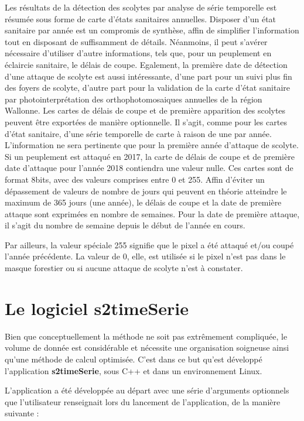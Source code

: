 \documentclass[a4paper, 12pt]{article} %
\begin{document}
Les résultats de la détection des scolytes par analyse de série temporelle est résumée sous forme de carte d'états sanitaires annuelles. Disposer d'un état sanitaire par année est un compromis de synthèse, affin de simplifier l'information tout en disposant de suffisamment de détails. Néanmoins, il peut s'avérer nécessaire d'utiliser d'autre informations, tels que, pour un peuplement en éclaircie sanitaire, le délais de coupe. Egalement, la première date de détection d'une attaque de scolyte est aussi intéressante, d'une part pour un suivi plus fin des foyers de scolyte, d'autre part pour la validation de la carte d'état sanitaire par photointerprétation des orthophotomosaiques annuelles de la région Wallonne.
Les cartes de délais de coupe et de première apparition des scolytes peuvent être exportées de manière optionnelle. Il s'agit, comme pour les cartes d'état sanitaire, d'une série temporelle de carte à raison de une par année.
L'information ne sera pertinente que pour la première année d'attaque de scolyte. 
Si un peuplement est attaqué en 2017, la carte de délais de coupe et de première date d'attaque pour l'année  2018 contiendra une valeur nulle.
Ces cartes sont de format 8bits, avec des valeurs comprises entre 0 et 255.
Affin d'éviter un dépassement de valeurs de nombre de jours qui peuvent en théorie atteindre le maximum de 365 jours (une année), le délais de coupe et la date de première attaque sont exprimées en nombre de semaines. Pour la date de première attaque, il s'agit du nombre de semaine depuis le début de l'année en cours.

Par ailleurs, la valeur spéciale 255 signifie que le pixel a été attaqué et/ou coupé l'année précédente. La valeur de 0, elle, est utilisée si le pixel n'est pas dans le masque forestier ou si aucune attaque de scolyte n'est à constater.

\section{Le logiciel s2{\textunderscore}timeSerie}

Bien que conceptuellement la méthode ne soit pas extrêmement compliquée, le volume de donnée est considérable et nécessite une organisation soigneuse ainsi qu'une méthode de calcul optimisée. C'est dans ce but qu'est développé l'application \textbf{s2{\textunderscore}timeSerie}, sous C++ et dans un environnement Linux.

L'application a été développée au départ avec une série d'arguments optionnels que l'utilisateur renseignait lors du lancement de l'application, de la manière suivante :
\end{document}
